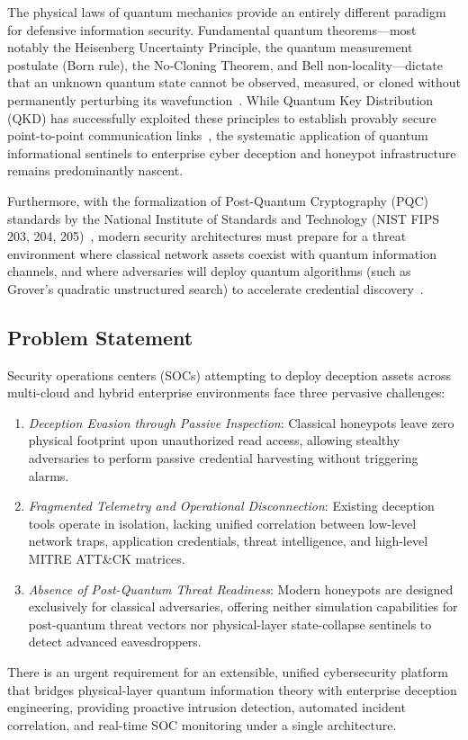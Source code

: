 \documentclass[journal,10pt]{IEEEtran}
\begin{document}
The physical laws of quantum mechanics provide an entirely different paradigm for defensive information security. Fundamental quantum theorems---most notably the Heisenberg Uncertainty Principle, the quantum measurement postulate (Born rule), the No-Cloning Theorem, and Bell non-locality---dictate that an unknown quantum state cannot be observed, measured, or cloned without permanently perturbing its wavefunction~\cite{alvarez2024quantum,li2024universal}. While Quantum Key Distribution (QKD) has successfully exploited these principles to establish provably secure point-to-point communication links~\cite{zhang2024physical,mora2024qkd}, the systematic application of quantum informational sentinels to enterprise cyber deception and honeypot infrastructure remains predominantly nascent. 

Furthermore, with the formalization of Post-Quantum Cryptography (PQC) standards by the National Institute of Standards and Technology (NIST FIPS 203, 204, 205)~\cite{nist2024pqc}, modern security architectures must prepare for a threat environment where classical network assets coexist with quantum information channels, and where adversaries will deploy quantum algorithms (such as Grover's quadratic unstructured search) to accelerate credential discovery~\cite{singh2024postquantum}.

\subsection{Problem Statement}
Security operations centers (SOCs) attempting to deploy deception assets across multi-cloud and hybrid enterprise environments face three pervasive challenges:
\begin{enumerate}
    \item \emph{Deception Evasion through Passive Inspection}: Classical honeypots leave zero physical footprint upon unauthorized read access, allowing stealthy adversaries to perform passive credential harvesting without triggering alarms.
    \item \emph{Fragmented Telemetry and Operational Disconnection}: Existing deception tools operate in isolation, lacking unified correlation between low-level network traps, application credentials, threat intelligence, and high-level MITRE ATT\&CK matrices.
    \item \emph{Absence of Post-Quantum Threat Readiness}: Modern honeypots are designed exclusively for classical adversaries, offering neither simulation capabilities for post-quantum threat vectors nor physical-layer state-collapse sentinels to detect advanced eavesdroppers.
\end{enumerate}
There is an urgent requirement for an extensible, unified cybersecurity platform that bridges physical-layer quantum information theory with enterprise deception engineering, providing proactive intrusion detection, automated incident correlation, and real-time SOC monitoring under a single architecture.
\end{document}
